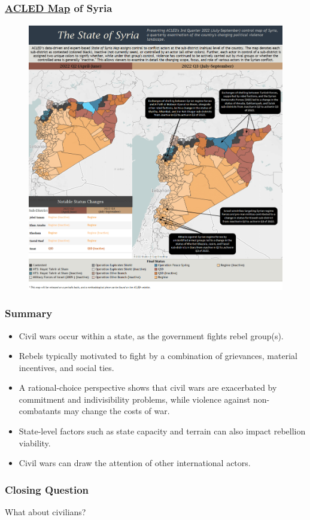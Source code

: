 \documentclass[handout]{beamer}
\begin{document}
%
\begin{frame} 
	\frametitle{\LARGE{\href{https://acleddata.com/2022/12/01/the-state-of-syria-q2-2022-q3-2022/}{ACLED Map} of Syria}}
	\begin{figure}[ht!]
		\centering
		\includegraphics[width=\textwidth,height=\textheight,keepaspectratio]{Syria-Q3-2022.png}
	\end{figure}
\end{frame}



\begin{frame} 
	\frametitle{\LARGE{Summary}}
	\begin{itemize}
		\item Civil wars occur within a state, as the government fights rebel group(s). \pause
		\item Rebels typically motivated to fight by a combination of grievances, material incentives, and social ties. \pause
		\item A rational-choice perspective shows that civil wars are exacerbated by commitment and indivisibility problems, while violence against non-combatants may change the costs of war. \pause
		\item State-level factors such as state capacity and terrain can also impact rebellion viability. \pause
		\item Civil wars can draw the attention of other international actors.
	\end{itemize}
\end{frame}

\begin{frame} 
	\frametitle{\LARGE{Closing Question}}
	\centering
	\Large{What about civilians?} 
\end{frame}
\end{document}

